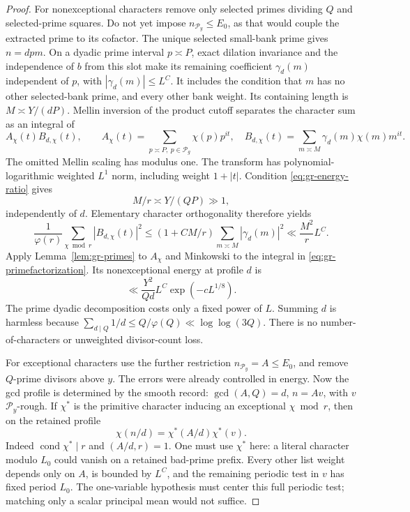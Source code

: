 \begin{proof}
For nonexceptional characters remove only selected primes dividing
\(Q\) and selected-prime squares.  Do not yet impose \(n_{\mathcal P_y}\le E_0\),
as that would couple the extracted prime to its cofactor.
The unique selected small-bank prime gives \(n=dpm\).
On a dyadic prime interval \(p\asymp P\), exact dilation invariance
and the independence of \(b\) from this slot make its remaining
coefficient \(\gamma_d(m)\) independent of \(p\), with
\(|\gamma_d(m)|\le L^C\).
It includes the condition that \(m\) has no other selected-bank prime,
and every other bank weight.  Its containing length is
\(M\asymp Y/(dP)\).
Mellin inversion of the product cutoff separates the character sum as
an integral of
\begin{equation}
 A_\chi(t)B_{d,\chi}(t),\qquad
 A_\chi(t)=\sum_{p\asymp P,\ p\in\mathcal P_g}\chi(p)p^{it},
 \quad
 B_{d,\chi}(t)=\sum_{m\asymp M}\gamma_d(m)\chi(m)m^{it}.
 \label{eq:gr-primefactorization}
\end{equation}
The omitted Mellin scaling has modulus one.
The transform has polynomial-logarithmic weighted \(L^1\) norm,
including weight \(1+|t|\).
Condition \eqref{eq:gr-energy-ratio} gives
\[
                       M/r\asymp Y/(QP)\gg1,
\]
independently of \(d\).
Elementary character orthogonality therefore yields
\begin{equation}
 \frac1{\varphi(r)}\sum_{\chi\bmod r}|B_{d,\chi}(t)|^2
 \le(1+CM/r)\sum_{m\asymp M}|\gamma_d(m)|^2
                  \ll \frac{M^2}{r}L^C.             \label{eq:gr-cofactorenergy}
\end{equation}
Apply Lemma~\ref{lem:gr-primes} to \(A_\chi\) and Minkowski to the
integral in \eqref{eq:gr-primefactorization}.
Its nonexceptional energy at profile \(d\) is
\begin{equation}
 \ll \frac{Y^2}{Qd}L^C\exp(-cL^{1/8}).               \label{eq:gr-nonexceptional}
\end{equation}
The prime dyadic decomposition costs only a fixed power of \(L\).
Summing \(d\) is harmless because
\(\sum_{d\mid Q}1/d\le Q/\varphi(Q)\ll\log\log(3Q)\).
There is no number-of-characters or unweighted divisor-count loss.

For exceptional characters use the further restriction
\(n_{\mathcal P_y}=A\le E_0\), and remove \(Q\)-prime divisors above \(y\).
The errors were already controlled in energy.
Now the gcd profile is determined by the smooth record:
\(\gcd(A,Q)=d\), \(n=Av\), with \(v\) \(\mathcal P_y\)-rough.
If \(\chi^*\) is the primitive character inducing an exceptional
\(\chi\bmod r\), then on the retained profile
\[
             \chi(n/d)=\chi^*(A/d)\chi^*(v).
\]
Indeed \(\operatorname{cond}\chi^*\mid r\) and
\((A/d,r)=1\). One must use \(\chi^*\) here: a literal character
modulo \(L_0\) could vanish on a retained bad-prime prefix.
Every other list weight depends only on \(A\), is bounded by \(L^C\),
and the remaining periodic test in \(v\) has fixed period \(L_0\).
The one-variable hypothesis must center this full periodic test;
matching only a scalar principal mean would not suffice.


\end{proof}
